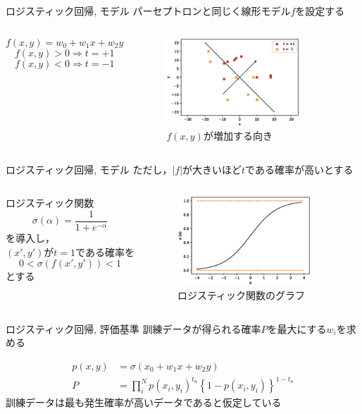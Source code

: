 \documentclass[dvipdfmx,platex]{beamer}
\begin{document}
\begin{frame}{{\mgfamily ロジスティック回帰, モデル}}
  パーセプトロンと同じく線形モデル$f$を設定する
  \begin{columns}[T,onlytextwidth]
    \[f(x,y)=w_0+w_1x+w_2y\]
    \[f(x,y)>0\Rightarrow t = +1\]
    \[f(x,y)<0\Rightarrow t = -1\]
    \begin{figure}
      \centering
      \includegraphics[width=5cm]{fig/direction.eps}
      \caption{$f(x,y)${\mgfamily が増加する向き}}
    \end{figure}
  \end{columns}
\end{frame}
\begin{frame}{{\mgfamily ロジスティック回帰, モデル}}
  ただし，$|f|$が大きいほど$t$である確率が高いとする
  \begin{columns}[T,onlytextwidth]
    ロジスティック関数
    \[\sigma\left(\alpha\right)=\frac{1}{1+e^{-\alpha}}\]
    を導入し，\\
    $(x',y')$が$t=1$である確率を\\
    \[0 < \sigma \left(f\left(x',y'\right)\right) < 1\]
    とする
    \begin{figure}
      \centering
      \includegraphics[width=5cm]{fig/sigmoid.eps}
      \caption{{\mgfamily ロジスティック関数のグラフ}}
    \end{figure}
  \end{columns}
\end{frame}
\begin{frame}{{\mgfamily ロジスティック回帰, 評価基準}}
  訓練データが得られる確率$P$を最大にする$w_i$を求める

  \begin{align*}
    p(x,y)&=\sigma(x_0+w_1x+w_2y)\\
    P&=\prod_{i}^{N}{p\left(x_i,y_i\right)}^{t_n}{\left\{1-p\left(x_i,y_i\right)\right\}}^{1-t_n}
  \end{align*}  
  訓練データは最も発生確率が高いデータであると仮定している
\end{frame}
\end{document}
